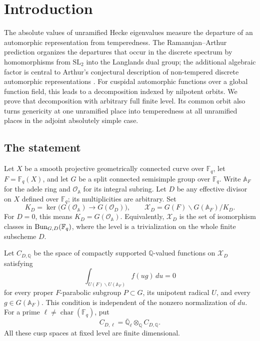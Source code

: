 \section{Introduction}\label{sec:introduction}

The absolute values of unramified Hecke eigenvalues measure the departure
of an automorphic representation from temperedness. The Ramanujan--Arthur
prediction organizes the departures that occur in the discrete spectrum
by homomorphisms from \(\mathrm{SL}_2\) into the Langlands dual group;
the additional algebraic factor is central to Arthur's conjectural
description of non-tempered discrete automorphic representations
\cite[Sections~4 and~8]{Arthur1989}.
For cuspidal automorphic functions over a global function field, this leads to a decomposition
indexed by nilpotent orbits. We prove that decomposition with arbitrary
full finite level. Its common orbit also turns genericity at one
unramified place into temperedness at all unramified places in the
adjoint absolutely simple case.

\subsection{The statement}

Let \(X\) be a smooth projective geometrically connected curve over
\(\mathbb F_q\), let \(F=\mathbb F_q(X)\), and let \(G\) be a split
connected semisimple group over \(\mathbb F_q\). Write \(\mathbb A_F\)
for the adele ring and \(\mathcal O_{\mathbb A}\) for its integral
subring. Let \(D\) be any effective divisor on \(X\) defined over
\(\mathbb F_q\); its multiplicities are arbitrary. Set
\begin{equation}\label{intro:level}
 K_D=\ker\bigl(G(\mathcal O_{\mathbb A})\longrightarrow
                   G(\mathcal O_D)\bigr),
 \qquad
 \mathcal X_D=G(F)\backslash G(\mathbb A_F)/K_D.
\end{equation}
For \(D=0\), this means \(K_D=G(\mathcal O_{\mathbb A})\).
Equivalently, \(\mathcal X_D\) is the set of isomorphism classes in
\(\operatorname{Bun}_{G,D}(\mathbb F_q)\), where the level is a trivialization on
the whole finite subscheme \(D\).

Let \(C_{D,\mathbb Q}\) be the space of compactly supported
\(\mathbb Q\)-valued functions on \(\mathcal X_D\) satisfying
\begin{equation}\label{intro:cuspidality}
 \int_{U(F)\backslash U(\mathbb A_F)} f(ug)\,du=0
\end{equation}
for every proper \(F\)-parabolic subgroup \(P\subset G\), its
unipotent radical \(U\), and every \(g\in G(\mathbb A_F)\).
This condition is independent of the nonzero normalization of \(du\).
For a prime \(\ell\ne\operatorname{char}(\mathbb F_q)\), put
\[
 C_{D,\ell}=\overline{\mathbb Q}_\ell\otimes_{\mathbb Q}C_{D,\mathbb Q}.
\]
All these cusp spaces at fixed level are finite dimensional.

